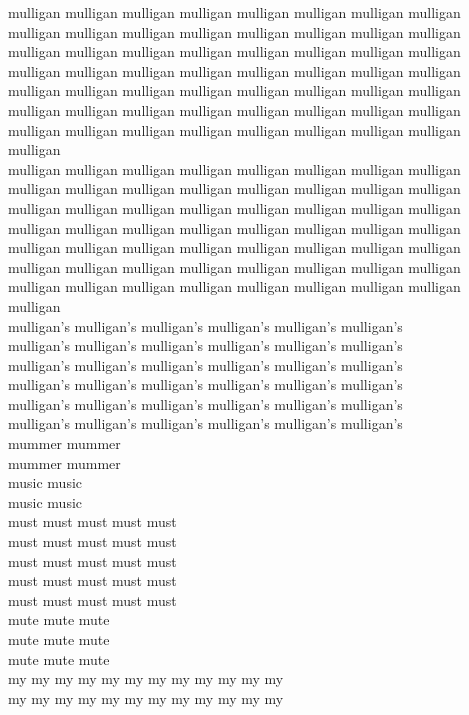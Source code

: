 mulligan mulligan mulligan mulligan mulligan mulligan mulligan mulligan mulligan mulligan mulligan mulligan mulligan mulligan mulligan mulligan mulligan mulligan mulligan mulligan mulligan mulligan mulligan mulligan mulligan mulligan mulligan mulligan mulligan mulligan mulligan mulligan mulligan mulligan mulligan mulligan mulligan mulligan mulligan mulligan mulligan mulligan mulligan mulligan mulligan mulligan mulligan mulligan mulligan mulligan mulligan mulligan mulligan mulligan mulligan mulligan mulligan\\
mulligan mulligan mulligan mulligan mulligan mulligan mulligan mulligan mulligan mulligan mulligan mulligan mulligan mulligan mulligan mulligan mulligan mulligan mulligan mulligan mulligan mulligan mulligan mulligan mulligan mulligan mulligan mulligan mulligan mulligan mulligan mulligan mulligan mulligan mulligan mulligan mulligan mulligan mulligan mulligan mulligan mulligan mulligan mulligan mulligan mulligan mulligan mulligan mulligan mulligan mulligan mulligan mulligan mulligan mulligan mulligan mulligan\\
mulligan's mulligan's mulligan's mulligan's mulligan's mulligan's\\
mulligan's mulligan's mulligan's mulligan's mulligan's mulligan's\\
mulligan's mulligan's mulligan's mulligan's mulligan's mulligan's\\
mulligan's mulligan's mulligan's mulligan's mulligan's mulligan's\\
mulligan's mulligan's mulligan's mulligan's mulligan's mulligan's\\
mulligan's mulligan's mulligan's mulligan's mulligan's mulligan's\\
mummer mummer\\
mummer mummer\\
music music\\
music music\\
must must must must must\\
must must must must must\\
must must must must must\\
must must must must must\\
must must must must must\\
mute mute mute\\
mute mute mute\\
mute mute mute\\
my my my my my my my my my my my my\\
my my my my my my my my my my my my\\
